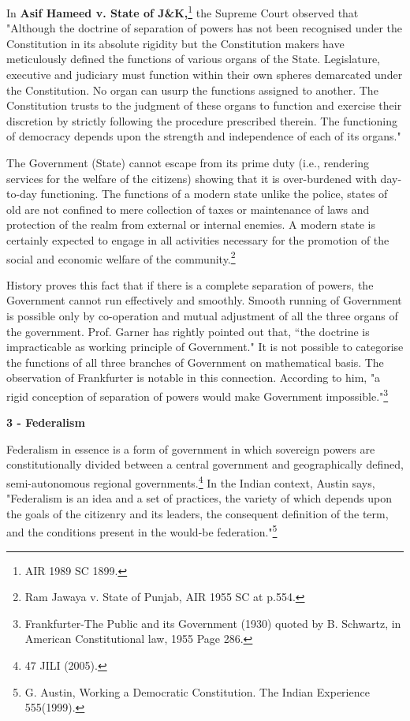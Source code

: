 \begin{multicols}{2}
\noi
In \textbf{Asif Hameed v. State of J\&K,}\footnote{AIR 1989 SC 1899.} the Supreme Court observed that "Although the doctrine of
separation of powers has not been recognised under the Constitution in its absolute rigidity but
the Constitution makers have meticulously defined the functions of various organs of the State.
Legislature, executive and judiciary must function within their own spheres demarcated under the
Constitution. No organ can usurp the functions assigned to another. The Constitution trusts to the
judgment of these organs to function and exercise their discretion by strictly following the
procedure prescribed therein. The functioning of democracy depends upon the strength and
independence of each of its organs."

\noi
The Government (State) cannot escape from its prime duty (i.e., rendering services for the welfare
of the citizens) showing that it is over-burdened with day-to-day functioning. The functions of a
modern state unlike the police, states of old are not confined to mere collection of taxes or maintenance of laws and protection of the realm from external or internal enemies. A modern
state is certainly expected to engage in all activities necessary for the promotion of the social and
economic welfare of the community.\footnote{Ram Jawaya v. State of Punjab, AIR 1955 SC at p.554.}

\noi
History proves this fact that if there is a complete separation of powers, the Government cannot
run effectively and smoothly. Smooth running of Government is possible only by co-operation
and mutual adjustment of all the three organs of the government. Prof. Garner has rightly pointed
out that, “the doctrine is impracticable as working principle of Government." It is not possible to
categorise the functions of all three branches of Government on mathematical basis. The
observation of Frankfurter is notable in this connection. According to him, "a rigid conception of
separation of powers would make Government impossible."\footnote{Frankfurter-The Public and its Government (1930) quoted by B. Schwartz, in American Constitutional law, 1955 Page 286.}

\noi
{\large \bfseries 3 - Federalism}

\vspace{-.15cm}

\noi
Federalism in essence is a form of government in which sovereign powers are constitutionally
divided between a central government and geographically defined, semi-autonomous regional
governments.\footnote{47 JILI (2005).} In the Indian context, Austin says, "Federalism is an idea and a set of practices, the variety of which depends upon the goals of the citizenry and its leaders, the consequent definition of the term, and the conditions present in the would-be federation."\footnote{G. Austin, Working a Democratic Constitution. The Indian Experience 555(1999).}


\end{multicols}

